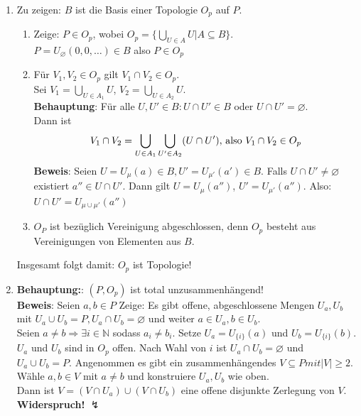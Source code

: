 \begin{solution}
  \
  \begin{enumerate}
    \item   Zu zeigen: \( B \) ist die Basis einer Topologie \( O_p \) auf \( P \).
    \begin{enumerate}
      \item Zeige: \( P \in O_p \), wobei \( O_p = \{ \bigcup_{U \in A} U | A \subseteq B \} \). \\
      \( P = U_{\varnothing} (0,0, \dots) \in B \) also \( P \in O_p \)
      \item Für \( V_1,V_2 \in O_p \) gilt \( V_1 \cap V_2 \in O_p \). \\
      Sei \( V_1 = \bigcup_{U \in A_1} U \), \( V_2 = \bigcup_{U \in A_2} U \). \\
      \textbf{Behauptung}: Für alle \( U,U' \in B: U \cap U' \in B \) oder \( U \cap U' = \varnothing \). \\
      Dann ist 
      \begin{equation*}
        V_1 \cap V_2 = \bigcup_{U \in A_1} \bigcup_{U' \in A_2} (U \cap U')\text{, also } V_1 \cap V_2 \in O_p \\
      \end{equation*}
      \textbf{Beweis}: Seien \( U = U_{\mu} (a) \in B , U' = U_{\mu'} (a') \in B \). Falls \( U \cap U' \neq \varnothing \) existiert \( a'' \in U \cap U' \). Dann gilt \( U = U_{\mu}(a'') \), \( U' = U_{\mu'}(a'') \). Also: \\
      \( U \cap U' = U_{\mu \cup \mu'} (a'') \)
      \item \( O_P \) ist bezüglich Vereinigung abgeschlossen, denn \( O_p \) besteht aus Vereinigungen von Elementen aus \( B \). \\
    \end{enumerate}
    Insgesamt folgt damit: \( O_p \) ist Topologie! 

    \item \textbf{Behauptung:}: \( (P, O_p) \) ist total unzusammenhängend! \\
    \textbf{Beweis}: Seien \( a,b \in P \) Zeige: Es gibt offene, abgeschlossene Mengen \( U_a, U_b \) mit \( U_a \cup U_b = P, U_a \cap U_b = \varnothing \) und weiter \( a \in U_a , b \in U_b \). \\
    Seien \( a \neq b \Rightarrow \exists i \in \mathbb{N} \) sodass \( a_i \neq b_i \). Setze \( U_a = U_{\{ i \}}(a) \) und \( U_b = U_{\{ i \}}(b) \). \\
    \( U_a \) und \( U_b \) sind in \( O_p \) offen. Nach Wahl von \( i \) ist \( U_a \cap U_b = \varnothing \) und \( U_a \cup U_b = P \). Angenommen es gibt ein zusammenhängendes \( V \subseteq P mit \vert V \vert \geq 2 \). \\
    Wähle \( a, b \in V \) mit \( a \neq b \) und konstruiere \( U_a, U_b \) wie oben. \\
    Dann ist \( V = (V \cap U_a) \cup (V \cap U_b) \) eine offene disjunkte Zerlegung von \( V \). \\
    \textbf{Widerspruch!} \( \lightning \)
  \end{enumerate}
\end{solution}


